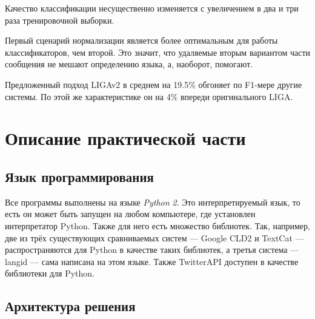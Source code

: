 \documentclass[a4paper, 14pt]{article}
\begin{document}
		Качество классификации несущественно изменяется с увеличением в два и три раза тренировочной выборки.
		
		Первый сценарий нормализации является более оптимальным для работы классификаторов, чем второй. Это значит, что удаляемые вторым вариантом части сообщения не мешают определению языка, а, наоборот, помогают.
		
		Предложенный подход LIGAv2 в среднем на 19.5\% обгоняет по F1-мере другие системы. По этой же характеристике он на 4\% впереди оригинального LIGA.
		
	
\pagebreak		

\section{Описание практической части}
		\subsection{Язык программирования}
		Все программы выполнены на языке \textit{Python 2}. Это интерпретируемый язык, то есть он может быть запущен на любом компьютере, где установлен интерпретатор Python. Также для него есть множество библиотек. Так, например, две из трёх существующих сравниваемых систем --- Google CLD2 и TextCat --- распространяются для Python в качестве таких библиотек, а третья система --- langid --- сама написана на этом языке. Также TwitterAPI доступен в качестве библиотеки для Python.
		
		\subsection{Архитектура решения}
\end{document}
